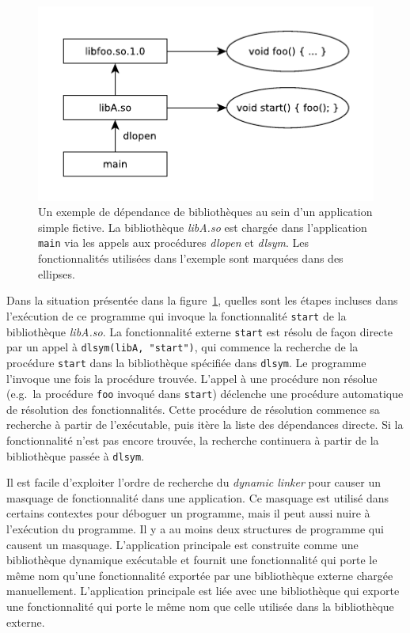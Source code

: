 \begin{center}
    \begin{figure}[ht]
        \includegraphics{figures/libdeps-ex1.pdf}

        \caption{Un exemple de dépendance de bibliothèques au sein d'un
          application simple fictive.  La bibliothèque \textit{libA.so} est
          chargée dans l'application \texttt{main} via les appels aux procédures
          \textit{dlopen} et \textit{dlsym}. Les fonctionnalités utilisées dans
          l'exemple sont marquées dans des ellipses.}

        \label{fig:deps-ex1}
    \end{figure}
\end{center}

Dans la situation présentée dans la figure~\ref{fig:deps-ex1}, quelles sont les étapes incluses
dans l'exécution de ce programme qui invoque la fonctionnalité \texttt{start} de la
bibliothèque \textit{libA.so}. La fonctionnalité externe \texttt{start} est résolu de façon directe par
un appel à \verb|dlsym(libA, "start")|, qui commence la recherche de la procédure \texttt{start} dans
la bibliothèque spécifiée dans \texttt{dlsym}. Le programme l'invoque une fois la procédure trouvée.
L'appel à une procédure non résolue (e.g.\ la procédure \texttt{foo} invoqué dans \texttt{start})
déclenche une procédure automatique de résolution des fonctionnalités. Cette procédure de résolution
commence sa recherche à partir de l'exécutable, puis itère la liste des dépendances directe. Si la
fonctionnalité n'est pas encore trouvée, la recherche continuera à partir de la bibliothèque passée à
\texttt{dlsym}.


Il est facile d'exploiter l'ordre de recherche du \textit{dynamic linker} pour
causer un masquage de fonctionnalité dans une application. Ce masquage est
utilisé dans certains contextes pour déboguer un programme, mais il peut aussi
nuire à l'exécution du programme. Il y a au moins deux structures de programme
qui causent un masquage. L'application principale est construite comme une
bibliothèque dynamique exécutable et fournit une fonctionnalité qui porte le
même nom qu'une fonctionnalité exportée par une bibliothèque externe chargée
manuellement.  L'application principale est liée avec une bibliothèque qui
exporte une fonctionnalité qui porte le même nom que celle utilisée dans la
bibliothèque externe.

